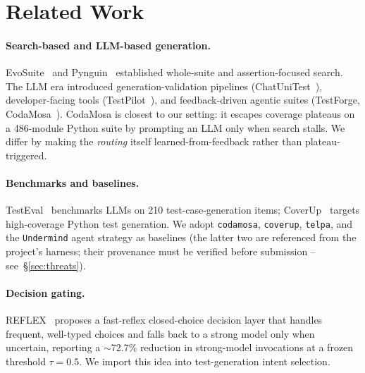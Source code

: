 \documentclass[11pt]{article}
\begin{document}
\section{Related Work}
\paragraph{Search-based and LLM-based generation.}
EvoSuite~\cite{evosuite} and Pynguin~\cite{pynguin} established whole-suite and assertion-focused search. The LLM era introduced generation-validation pipelines (ChatUniTest~\cite{chatunitest}), developer-facing tools (TestPilot~\cite{testpilot}), and feedback-driven agentic suites (TestForge, CodaMosa~\cite{codamosa}). CodaMosa is closest to our setting: it escapes coverage plateaus on a 486-module Python suite by prompting an LLM only when search stalls. We differ by making the \emph{routing} itself learned-from-feedback rather than plateau-triggered.
\paragraph{Benchmarks and baselines.}
TestEval~\cite{testeval} benchmarks LLMs on 210 test-case-generation items; CoverUp~\cite{coverup} targets high-coverage Python test generation. We adopt \texttt{codamosa}, \texttt{coverup}, \texttt{telpa}, and the \texttt{Undermind} agent strategy as baselines (the latter two are referenced from the project's harness; their provenance must be verified before submission -- see~\S\ref{sec:threats}).
\paragraph{Decision gating.}
REFLEX~\cite{reflex} proposes a fast-reflex closed-choice decision layer that handles frequent, well-typed choices and falls back to a strong model only when uncertain, reporting a $\sim$72.7\% reduction in strong-model invocations at a frozen threshold $\tau=0.5$. We import this idea into test-generation intent selection.
\end{document}

